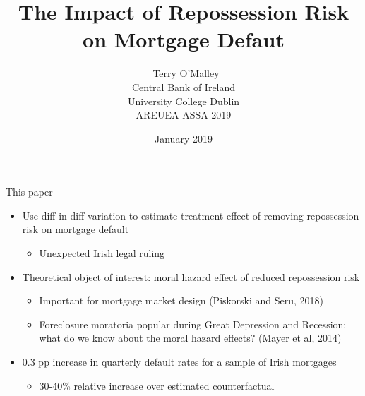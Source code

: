 \documentclass[ignorenonframetext,aspectratio=169]{beamer}
\title{The Impact of Repossession Risk on Mortgage Defaut\\}
\author{~Terry O'Malley\\
Central Bank of Ireland\\
University College Dublin\\[2\baselineskip]AREUEA ASSA 2019}
\date{January 2019}
\providecommand{\tightlist}{%
  \setlength{\itemsep}{0pt}\setlength{\parskip}{0pt}}
\begin{document}
\frame{\titlepage}

\begin{frame}{This paper}

\begin{itemize}
\tightlist
\item
  Use diff-in-diff variation to estimate treatment effect of removing
  repossession risk on mortgage default

  \begin{itemize}
  \tightlist
  \item
    Unexpected Irish legal ruling
  \end{itemize}
\item
  Theoretical object of interest: moral hazard effect of reduced
  repossession risk

  \begin{itemize}
  \tightlist
  \item
    Important for mortgage market design (Piskorski and Seru, 2018)
  \item
    Foreclosure moratoria popular during Great Depression and Recession:
    what do we know about the moral hazard effects? (Mayer et al, 2014)
  \end{itemize}
\item
  0.3 pp increase in quarterly default rates for a sample of Irish
  mortgages

  \begin{itemize}
  \tightlist
  \item
    30-40\% relative increase over estimated counterfactual
  \end{itemize}
\end{itemize}

\end{frame}
\end{document}
